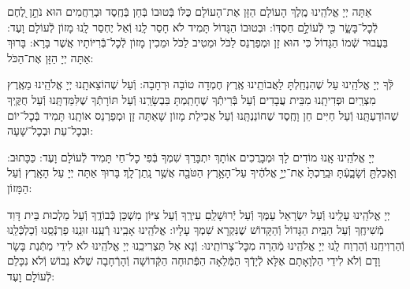 \documentclass[twoside, openany, parskip=half, 11pt]{book}
\begin{document}
\nextpage
{}
אַתָּה יְיָ אֱלֹהֵֽינוּ מֶֽלֶךְ הָעוֹלָם הַזָּן אֶת־הָעוֹלָם כֻּלּוֹ בְּֿטוּבוֹ בְּֿחֵן בְּֿחֶֽסֶד וּבְרַחֲמִים הוּא נֹתֵ֣ן לֶ֭חֶם לְֿכׇל־בָּשָׂ֑ר כִּ֖י לְֿעוֹלָ֣ם חַסְדּֽוֹ: וּבְטוּבוֹ הַגָּדוֹל תָּמִיד לֹא חָסַר לָֽנוּ וְֿאַל יֶחְסַר לָֽנוּ מָזוֹן לְֿעוֹלָם וָעֶד: בַּעֲבוּר שְֿׁמוֹ הַגָּדוֹל כִּי הוּא זָן וּמְפַרְנֵס לַכֹּל וּמֵטִיב לַכֹּל וּמֵכִין מָזוֹן לְֿכׇל־בְּֿֿרִיּוֹתָיו אֲשֶׁר בָּרָא: בָּרוּךְ אַתָּה יְיָ הַזָּן אֶת־הַכֹּל:



לְּֿךָ יְיָ אֱלֹהֵֽינוּ עַל שֶׁהִנְחַֽלְתָּ לַאֲבוֹתֵֽינוּ אֶֽרֶץ חֶמְדָה טוֹבָה וּרְחָבָה: וְֿעַל שֶׁהוֹצֵאתָֽנוּ יְיָ אֱלֹהֵֽינוּ מֵאֶֽרֶץ מִצְרַֽיִם וּפְדִיתָֽנוּ מִבֵּית עֲבָדִים וְֿעַל בְּֿרִיתְֿךָ שֶׁחָתַֽמְתָּ בִּבְשָׂרֵֽנוּ וְֿעַל תּוֹרָתְֿךָ שֶׁלִּמַּדְתָּֽנוּ וְֿעַל חֻקֶּֽיךָ שֶׁהוֹדַעְתָּֽנוּ וְֿעַל חַיִּים חֵן וָחֶֽסֶד שֶׁחוֹנַנְתָּֽנוּ וְֿעַל אֲכִילַת מָזוֹן שָׁאַתָּה זָן וּמְפַרְנֵס אוֹתָֽנוּ תָּמִיד בְּֿכׇל־יוֹם וּבְכׇל־עֵת וּבְכׇל־שָׁעָה:


\alhanisim

יְיָ אֱלֹהֵֽינוּ אָֽנוּ מוֹדִים לָךְ וּמְבָרֲכִים אוֹתָךְ יִתְבָּרַךְ שִׁמְךָ בְּֿפִי כׇל־חַי תָּמִיד לְֿעוֹלָם וָעֶד: כַּכָּתוּב: וְאָֽכַלְתָּ֖ וְֿשָׂבָ֑עְֿתָּ וּבֵֽרַכְתָּ֙ אֶת־יְיָ֣ אֱלֹהֶ֔יךָ עַל־הָאָ֥רֶץ הַטֹּבָ֖ה אֲשֶׁ֥ר נָֽתַן־לָֽךְ׃ בָּרוּךְ אַתָּה יְיָ עַל הָאָֽרֶץ וְֿעַל הַמָּזוֹן:



יְיָ אֱלֹהֵֽינוּ עָלֵֽינוּ וְֿעַל יִשְׂרָאֵל עַמֶּךָ וְֿעַל יְֿרוּשָׁלַֽםִ עִירֶֽךָ וְֿעַל צִיּוֹן מִשְׁכַּן כְּֿבוֹדֶֽךָ וְֿעַל מַלְכוּת בֵּית דָּוִד מְֿשִׁיחֶֽךָ וְֿעַל הַבַּֽיִת הַגָּדוֹל וְֿהַקָּדוֹשׁ שֶׁנִּקְרָא שִׁמְךָ עָלָיו: אֱלֹהֵֽינוּ אָבִֽינוּ רְֿעֵֽנוּ זוּנֵֽנוּ פַרְנְֿסֵֽנוּ וְֿכַלְכְּֿלֵֽנוּ וְֿהַרְוִיחֵֽנוּ וְֿהַרְוַח לָֽנוּ יְיָ אֱלֹהֵֽינוּ מְֿהֵרָה מִכׇּל־צָרוֹתֵֽינוּ: וְֿנָא אַל תַּצְרִיכֵֽנוּ יְיָ אֱלֹהֵֽינוּ לֹא לִידֵי מַתְּֿנַת בָּשָׂר וָדָם וְֿלֹא לִידֵי הַלְוָאָתָם אֶלָּא לְֿיָדְֿךָ הַמְּֿלֵאָה הַפְּֿתוּחָה הַקְּֿדוֹשָׁה וְֿהָרְֿחָבָה שֶׁלֹּא נֵבוֹשׁ וְֿלֹא נִכָּלֵם לְֿעוֹלָם וָעֶד:

\enlargethispage{\baselineskip}
\end{document}
